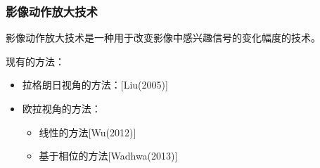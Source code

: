 \documentclass[xcolor=svgnames,serif,table,10pt]{beamer}
\begin{document}
\begin{frame}
\begin{center}
  \end{center}
\end{frame}

\begin{frame}
  \frametitle{影像动作放大技术}
  \large
  
  影像动作放大技术是一种用于改变影像中感兴趣信号的变化幅度的技术。

  \medskip

  现有的方法：
  \begin{itemize}
  \item 拉格朗日视角的方法：[Liu(2005)]
  \item 欧拉视角的方法：
    \begin{itemize}
    \item 线性的方法[Wu(2012)]
    \item 基于相位的方法[Wadhwa(2013)]
    \end{itemize}
  \end{itemize}
\end{frame}
\end{document}
